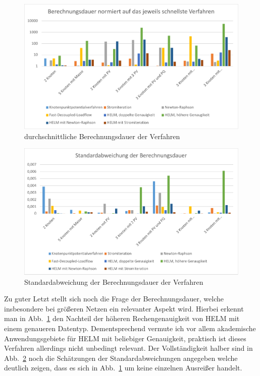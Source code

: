 \documentclass[12pt,a4paper]{article}
\newcommand{\reffig}[1]{{Abb.~\ref{#1}}}
\begin{document}
	\begin{figure}
		\centering
		\includegraphics[scale=0.8]{pictures/duration_mean}
		\caption{durchschnittliche Berechnungsdauer der Verfahren}
		\label{fig:duration_mean}
	\end{figure}
	
	\begin{figure}
		\centering
		\includegraphics[scale=0.8]{pictures/duration_deviation}
		\caption{Standardabweichung der Berechnungsdauer der Verfahren}
		\label{fig:duration_deviation}
	\end{figure}
	
	Zu guter Letzt stellt sich noch die Frage der Berechnungsdauer, welche insbesondere bei größeren Netzen ein relevanter Aspekt wird. Hierbei erkennt man in \reffig{fig:duration_mean} den Nachteil der höheren Rechengenauigkeit von HELM mit einem genaueren Datentyp. Dementsprechend vermute ich vor allem akademische Anwendungsgebiete für HELM mit beliebiger Genauigkeit, praktisch ist dieses Verfahren allerdings nicht unbedingt relevant. Der Vollständigkeit halber sind in \reffig{fig:duration_deviation} noch die Schätzungen der Standardabweichungen angegeben welche deutlich zeigen, dass es sich in \reffig{fig:duration_mean} um keine einzelnen Ausreißer handelt.
	
\end{document}
